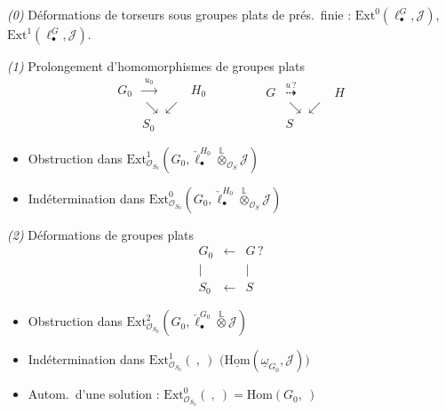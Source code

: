 \documentclass[11pt,a4paper]{article}
\begin{document}
\emph{(0)} Déformations de torseurs sous groupes plats de prés.\ finie : $\mathrm{Ext}^0(\ell^{G}_{\bullet}, \mathcal{J})$, $\mathrm{Ext}^1(\ell^{G}_{\bullet}, \mathcal{J})$.

\emph{(1)} Prolongement d'homomorphismes de groupes plats
\[
\begin{array}{ccc}
G_0 & \xrightarrow{\;u_0\;} & H_0 \\
 & \searrow \swarrow & \\
 & S_0 &
\end{array}
\qquad\qquad
\begin{array}{ccc}
G & \overset{u\,?}{\dashrightarrow} & H \\
 & \searrow \swarrow & \\
 & S &
\end{array}
\]
\begin{itemize}
  \item[a)] Obstruction dans $\mathrm{Ext}^1_{\mathcal{O}_{S_0}}(G_0, \check{\ell}^{H_0}_{\bullet} \overset{\mathbb{L}}{\otimes}_{\mathcal{O}_S} \mathcal{J})$
  \item[b)] Indétermination dans $\mathrm{Ext}^0_{\mathcal{O}_{S_0}}(G_0, \check{\ell}^{H_0}_{\bullet} \overset{\mathbb{L}}{\otimes}_{\mathcal{O}_S} \mathcal{J})$
\end{itemize}

\emph{(2)} Déformations de groupes plats
\[
\begin{array}{ccc}
G_0 & \longleftarrow & G\,? \\
\big| & & \big| \\
S_0 & \longleftarrow & S
\end{array}
\]
\begin{itemize}
  \item[a)] Obstruction dans $\mathrm{Ext}^2_{\mathcal{O}_{S_0}}(G_0, \check{\ell}^{G_0}_{\bullet} \overset{\mathbb{L}}{\otimes} \mathcal{J})$
  \item[b)] Indétermination dans $\mathrm{Ext}^1_{\mathcal{O}_{S_0}}(\ ,\ )$ \quad $\bigl(\underline{\mathrm{Hom}}(\underline{\omega}_{G_0}, \mathcal{J})\bigr)$
  \item[c)] Autom.\ d'une solution : $\mathrm{Ext}^0_{\mathcal{O}_{S_0}}(\ ,\ ) = \mathrm{Hom}(G_0, \ )$
\end{itemize}
\end{document}
